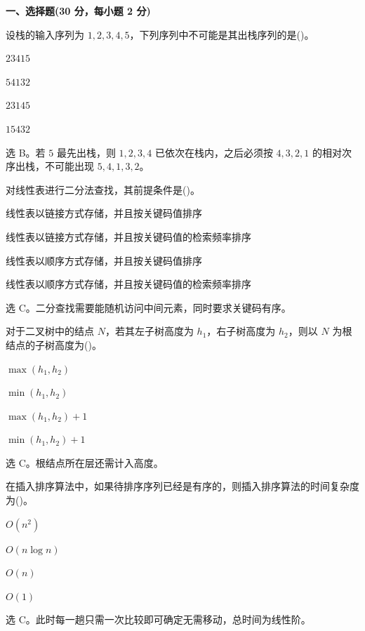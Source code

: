 \textbf{一、选择题(30 分，每小题 2 分)}

\begin{question}
设栈的输入序列为 $1,2,3,4,5$，下列序列中不可能是其出栈序列的是(\quad)。
\begin{choiceoptions}[2]
  \item $23415$
  \item $54132$
  \item $23145$
  \item $15432$
\end{choiceoptions}
\begin{solution}
选 B。若 $5$ 最先出栈，则 $1,2,3,4$ 已依次在栈内，之后必须按 $4,3,2,1$ 的相对次序出栈，不可能出现 $5,4,1,3,2$。
\end{solution}
\end{question}

\begin{question}
对线性表进行二分法查找，其前提条件是(\quad)。
\begin{choiceoptions}[2]
  \item 线性表以链接方式存储，并且按关键码值排序
  \item 线性表以链接方式存储，并且按关键码值的检索频率排序
  \item 线性表以顺序方式存储，并且按关键码值排序
  \item 线性表以顺序方式存储，并且按关键码值的检索频率排序
\end{choiceoptions}
\begin{solution}
选 C。二分查找需要能随机访问中间元素，同时要求关键码有序。
\end{solution}
\end{question}

\begin{question}
对于二叉树中的结点 $N$，若其左子树高度为 $h_1$，右子树高度为 $h_2$，则以 $N$ 为根结点的子树高度为(\quad)。
\begin{choiceoptions}[2]
  \item $\max(h_1,h_2)$
  \item $\min(h_1,h_2)$
  \item $\max(h_1,h_2)+1$
  \item $\min(h_1,h_2)+1$
\end{choiceoptions}
\begin{solution}
选 C。根结点所在层还需计入高度。
\end{solution}
\end{question}

\begin{question}
在插入排序算法中，如果待排序序列已经是有序的，则插入排序算法的时间复杂度为(\quad)。
\begin{choiceoptions}[2]
  \item $O(n^2)$
  \item $O(n\log n)$
  \item $O(n)$
  \item $O(1)$
\end{choiceoptions}
\begin{solution}
选 C。此时每一趟只需一次比较即可确定无需移动，总时间为线性阶。
\end{solution}
\end{question}

